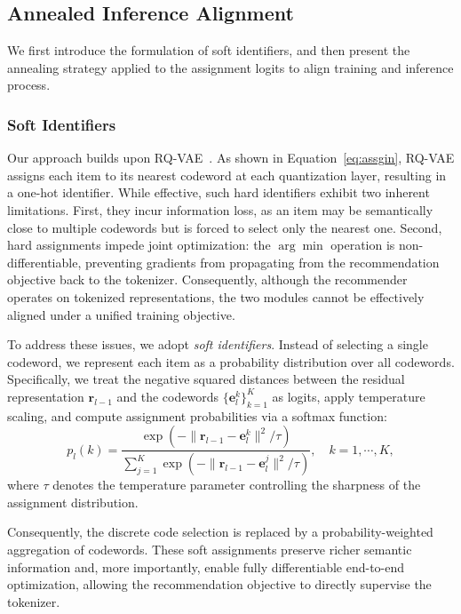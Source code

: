 \subsection{Annealed Inference Alignment}
We first introduce the formulation of soft identifiers, and then present the annealing strategy applied to the assignment logits to align training and inference process.

\subsubsection{Soft Identifiers}
Our approach builds upon RQ-VAE~\cite{TIGER}. As shown in Equation~\eqref{eq:assgin}, RQ-VAE assigns each item to its nearest codeword at each quantization layer, resulting in a one-hot identifier. While effective, such hard identifiers exhibit two inherent limitations. First, they incur information loss, as an item may be semantically close to multiple codewords but is forced to select only the nearest one. Second, hard assignments impede joint optimization: the $\arg\min$ operation is non-differentiable, preventing gradients from propagating from the recommendation objective back to the tokenizer. Consequently, although the recommender operates on tokenized representations, the two modules cannot be effectively aligned under a unified training objective.

To address these issues, we adopt \textit{soft identifiers}. Instead of selecting a single codeword, we represent each item as a probability distribution over all codewords. Specifically, we treat the negative squared distances between the residual representation $\bm{r}_{l-1}$ and the codewords $\{\bm{e}_l^k\}_{k=1}^{K}$ as logits, apply temperature scaling, and compute assignment probabilities via a softmax function:
\begin{equation}\label{eq:soft_prob}
p_l(k) = \frac{\exp \left( - \| \bm{r}_{l-1} - \bm{e}_l^k \|^2 / \tau \right)}{\sum_{j=1}^{K} \exp \left( - \| \bm{r}_{l-1} - \bm{e}_l^j \|^2 / \tau \right)}, \quad k=1,\cdots, K, 
\end{equation}
where $\tau$ denotes the temperature parameter controlling the sharpness of the assignment distribution. 

Consequently, the discrete code selection is replaced by a probability-weighted aggregation of codewords. These soft assignments preserve richer semantic information and, more importantly, enable fully differentiable end-to-end optimization, allowing the recommendation objective to directly supervise the tokenizer.

